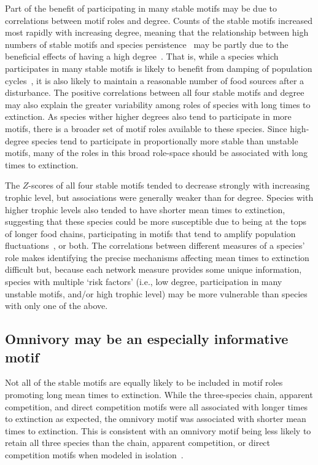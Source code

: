 \documentclass[12pt]{article}
\begin{document}
\begin{spacing}{2.0}
        
        Part of the benefit of participating in many stable motifs may be due to correlations between motif roles and degree.
        Counts of the stable motifs increased most rapidly with increasing degree, meaning that the relationship between high numbers of stable motifs and species persistence~\citep{Stouffer2007,Borrelli2015a} may be partly due to the beneficial effects of having a high degree~\citep{Cirtwill2016a}.
		That is, while a species which participates in many stable motifs is likely to benefit from damping of population cycles~\citep{Borrelli2015a}, it is also likely to maintain a reasonable number of food sources after a disturbance.
		The positive correlations between all four stable motifs and degree may also explain the greater variability among roles of species with long times to extinction.
		As species wither higher degrees also tend to participate in more motifs, there is a broader set of motif roles available to these species.
		Since high-degree species tend to participate in proportionally more stable than unstable motifs, many of the roles in this broad role-space should be associated with long times to extinction.

		
        The $Z$-scores of all four stable motifs tended to decrease strongly with increasing trophic level, but associations were generally weaker than for degree.
        Species with higher trophic levels also tended to have shorter mean times to extinction, suggesting that these species could be more susceptible due to being at the tops of longer food chains, participating in motifs that tend to amplify population fluctuations~\citep{Borrelli2015a}, or both.
        The correlations between different measures of a species' role makes identifying the precise mechanisms affecting mean times to extinction difficult but, because each network measure provides some unique information, species with multiple `risk factors' (i.e., low degree, participation in many unstable motifs, and/or high trophic level) may be more vulnerable than species with only one of the above.

        
    \subsection*{Omnivory may be an especially informative motif}
	    
        Not all of the stable motifs are equally likely to be included in motif roles promoting long mean times to extinction.
        While the three-species chain, apparent competition, and direct competition motifs were all associated with longer times to extinction as expected, the omnivory motif was associated with shorter mean times to extinction. 
        This is consistent with an omnivory motif being less likely to retain all three species than the chain, apparent competition, or direct competition motifs when modeled in isolation~\citep{Borrelli2015a}. 



\end{spacing}
\end{document}

